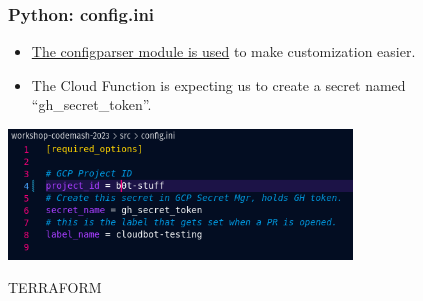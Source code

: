 \documentclass[aspectratio=169]{beamer}
\begin{document}
\begin{frame}
	\frametitle{Python: config.ini}

	\begin{itemize}
		\item \href{https://docs.python.org/3/library/configparser.html\#module-configparser}{The configparser module is used} to make customization easier.
		\item The Cloud Function is expecting us to create a secret named ``gh\_secret\_token''.
	\end{itemize}
	\vspace{2mm}

	\begin{center}
		\includegraphics[width=0.685\textwidth]{../images/config.ini.png}
	\end{center}
\end{frame}


\begin{frame}
	\Huge \textcolor{dgreen}{TERRAFORM}
\end{frame}
                                                              
\end{document}
